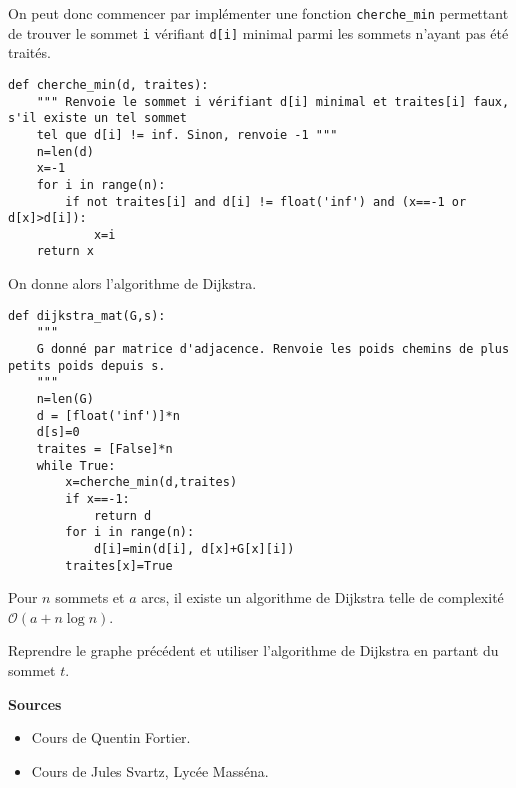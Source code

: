 On peut donc commencer par implémenter une fonction \texttt{cherche\_min} permettant de trouver le sommet \texttt{i} vérifiant \texttt{d[i]} minimal
parmi les sommets n'ayant pas été traités.%


\begin{lstlisting}
def cherche_min(d, traites):
    """ Renvoie le sommet i vérifiant d[i] minimal et traites[i] faux, s'il existe un tel sommet
    tel que d[i] != inf. Sinon, renvoie -1 """
    n=len(d)
    x=-1
    for i in range(n):
        if not traites[i] and d[i] != float('inf') and (x==-1 or d[x]>d[i]):
            x=i
    return x
\end{lstlisting}


On donne alors l'algorithme de Dijkstra.

\begin{lstlisting}
def dijkstra_mat(G,s):
    """ 
    G donné par matrice d'adjacence. Renvoie les poids chemins de plus petits poids depuis s. 
    """
    n=len(G)
    d = [float('inf')]*n
    d[s]=0
    traites = [False]*n
    while True:
        x=cherche_min(d,traites)
        if x==-1:
            return d
        for i in range(n):
            d[i]=min(d[i], d[x]+G[x][i])
        traites[x]=True
\end{lstlisting}

\begin{prop}
Pour $n$ sommets et $a$ arcs, il existe un algorithme de Dijkstra telle de complexité $\mathcal{O}\left(a+n\log n\right)$.
\end{prop}

\begin{exemple}
Reprendre le graphe précédent et utiliser l'algorithme de Dijkstra en partant du sommet $t$.
\end{exemple}

\vfill
\textbf{Sources}
\begin{itemize}
\item Cours de Quentin Fortier.
\item Cours de Jules Svartz, Lycée Masséna.
\end{itemize}